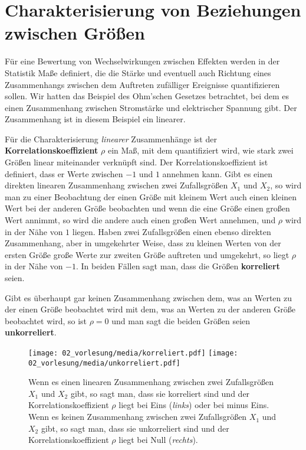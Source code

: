 \section{Charakterisierung von Beziehungen zwischen Größen}

Für eine Bewertung von Wechselwirkungen zwischen Effekten werden in der Statistik Maße
definiert, die die Stärke und eventuell auch Richtung eines Zusammenhangs zwischen dem
Auftreten zufälliger Ereignisse quantifizieren sollen. Wir hatten das Beispiel des Ohm'schen
Gesetzes betrachtet, bei dem es einen Zusammenhang zwischen Stromstärke und elektrischer
Spannung gibt. Der Zusammenhang ist in diesem Beispiel ein linearer.

Für die Charakterisierung \textsl{linearer} Zusammenhänge ist der
\textbf{Korrelationskoeffizient} $\rho$ ein Maß, mit dem quantifiziert wird, wie
stark zwei Größen linear miteinander verknüpft sind.
Der Korrelationskoeffizient ist definiert, dass er Werte zwischen $-1$ und
$1$ annehmen kann. Gibt es einen direkten linearen Zusammenhang zwischen zwei Zufallsgrößen
$X_1$ und $X_2$, so wird man zu einer Beobachtung der einen Größe mit kleinem Wert
auch einen kleinen Wert bei der anderen Größe beobachten und wenn die eine Größe einen
großen Wert annimmt, so wird die andere auch einen großen Wert annehmen, und
$\rho$ wird in der Nähe von $1$ liegen. Haben zwei Zufallsgrößen einen ebenso
direkten Zusammenhang, aber in umgekehrter Weise, dass zu kleinen Werten von der ersten
Größe große Werte zur zweiten Größe auftreten und umgekehrt, so liegt $\rho$ in der Nähe von $-1$.
In beiden Fällen sagt man, dass die Größen \textbf{korreliert} seien.

Gibt es überhaupt gar keinen Zusammenhang zwischen dem, was an Werten zu der einen Größe beobachtet
wird mit dem, was an Werten zu der anderen Größe beobachtet wird, so ist $\rho = 0$ und man
sagt die beiden Größen seien \textbf{unkorreliert}.

\begin{figure}
	\begin{center}
		\texttt{[image: 02\_vorlesung/media/korreliert.pdf]} \hspace{5mm}
		\texttt{[image: 02\_vorlesung/media/unkorreliert.pdf]}
		\caption{\label{korrelation} Wenn es einen linearen Zusammenhang zwischen
			zwei Zufallsgrößen $X_1$ und $X_2$ gibt, so sagt man, dass sie korreliert sind
			und der Korrelationskoeffizient $\rho$ liegt bei Eins (\textsl{links}) oder bei
			minus Eins. Wenn es keinen Zusammenhang zwischen zwei Zufallsgrößen $X_1$ und $X_2$
			gibt, so sagt man, dass sie unkorreliert sind
			und der Korrelationskoeffizient $\rho$ liegt bei Null (\textsl{rechts}).}
	\end{center}
\end{figure}

